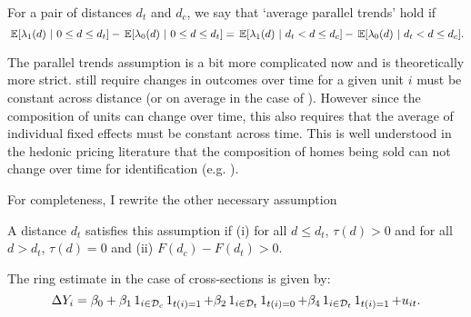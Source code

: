 \begin{assumption}\label{assum:parallel_weak_rc}
  For a pair of distances $d_t$ and $d_c$, we say that `average parallel trends' hold if 
  $$
    \expec{\lambda_1(d)}{0 \leq d \leq d_t} - \expec{\lambda_0(d)}{0 \leq d \leq d_t} = \expec{\lambda_1(d)}{d_t < d \leq d_c} - \expec{\lambda_0(d)}{d_t < d \leq d_c}.
  $$
\end{assumption}

The parallel trends assumption is a bit more complicated now and is theoretically more strict.  still require changes in outcomes over time for a given unit $i$ must be constant across distance (or on average in the case of ). However since the composition of units can change over time, this also requires that the average of individual fixed effects must be constant across time. This is well understood in the hedonic pricing literature that the composition of homes being sold can not change over time for identification (e.g. \cite{Linden_Rockoff_2008}).

For completeness, I rewrite the other necessary assumption
\begin{assumption}[Correct $d_t$]
  A distance $d_t$ satisfies this assumption if (i) for all $d \leq d_t$, $\tau(d) > 0$ and for all $d > d_t$, $\tau(d) = 0$ and (ii) $F(d_c) - F(d_t) > 0$.
\end{assumption}

The ring estimate in the case of cross-sections is given by:
\begin{equation}
  \Delta Y_{i} = \beta_0 + \beta_1 \one_{i \in \mathcal{D}_c} \one_{t(i) = 1} + \beta_2 \one_{i \in \mathcal{D}_t} \one_{t(i) = 0} + \beta_4 \one_{i \in \mathcal{D}_t} \one_{t(i) = 1} + u_{it}.
\end{equation}

